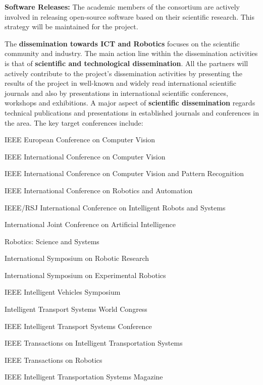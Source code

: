 \begin{denseItemize}
\item {\bf Software Releases:} The academic members of the consortium are actively involved in releasing open-source software based on their scientific research. This strategy will be maintained for the \Project{} project.
\end{denseItemize}

The \textbf{dissemination towards ICT and Robotics} focuses on the scientific community and industry.  The main action line within the dissemination activities is that of \textbf{scientific and technological dissemination}. All the partners will actively contribute to the project's dissemination activities by presenting the results of the project in well-known and widely read international scientific journals and also by presentations in international scientific conferences,
workshops and exhibitions.  A major aspect of {\bf scientific dissemination} regards technical publications and presentations in established journals and conferences in the area. The key target conferences include:

\begin{megaDenseItemize}
  \item IEEE European Conference on Computer Vision
  \item IEEE International Conference on Computer Vision
  \item IEEE International Conference on Computer Vision and Pattern Recognition 
  \item IEEE International Conference on Robotics and Automation
  \item IEEE/RSJ International Conference on Intelligent Robots and Systems
  \item International Joint Conference on Artificial Intelligence
  \item Robotics: Science and Systems
  \item International Symposium on Robotic Research
  \item International Symposium on Experimental Robotics
  \item IEEE Intelligent Vehicles Symposium
  \item Intelligent Transport Systems World Congress
  \item IEEE Intelligent Transport Systems Conference
  \item IEEE Transactions on Intelligent Transportation Systems
  \item IEEE Transactions on Robotics
  \item IEEE Intelligent Transportation Systems Magazine
\end{megaDenseItemize}


